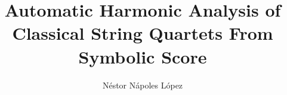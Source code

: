 \documentclass[a4paper,12pt,twoside]{report}
\begin{document}

\title{Automatic Harmonic Analysis of Classical String Quartets From Symbolic Score}
\author{N\'estor N\'apoles L\'opez}

\maketitle

\maketitle
\restoregeometry

\preface
\cleardoublepage




\body











\listoffigures
\newpage
\listoftables





\end{document}
